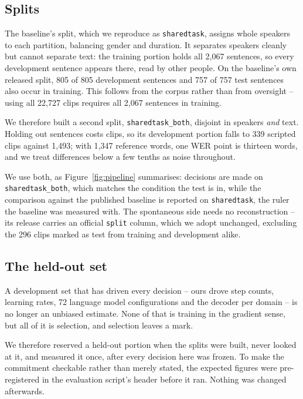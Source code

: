 \subsection{Splits}
\label{sec:splits}

The baseline's split, which we reproduce as \texttt{sharedtask}, assigns whole
speakers to each partition, balancing gender and duration. It separates
speakers cleanly but cannot separate text: the training portion holds all
2{,}067 sentences, so every development sentence appears there, read by other
people. On the baseline's own released split, 805 of 805 development sentences
and 757 of 757 test sentences also occur in training. This follows from the
corpus rather than from oversight -- using all 22{,}727 clips requires all
2{,}067 sentences in training.

We therefore built a second split, \texttt{sharedtask\_both}, disjoint in
speakers \emph{and} text. Holding out sentences costs clips, so its development
portion falls to 339 scripted clips against 1{,}493; with 1{,}347 reference
words, one WER point is thirteen words, and we treat differences below a few
tenths as noise throughout.

We use both, as Figure~\ref{fig:pipeline} summarises: decisions are made on
\texttt{sharedtask\_both}, which matches the condition the test is in, while
the comparison against the published baseline is reported on
\texttt{sharedtask}, the ruler the baseline was measured with.
The spontaneous side needs no reconstruction -- its release carries an official
\texttt{split} column, which we adopt unchanged, excluding the 296 clips marked
as test from training and development alike.

\subsection{The held-out set}
\label{sec:heldout}

A development set that has driven every decision -- ours drove step counts,
learning rates, 72 language model configurations and the decoder per domain --
is no longer an unbiased estimate. None of that is training in the gradient
sense, but all of it is selection, and selection leaves a mark.

We therefore reserved a held-out portion when the splits were built, never
looked at it, and measured it once, after every decision here was frozen. To
make the commitment checkable rather than merely stated, the expected figures
were pre-registered in the evaluation script's header before it ran. Nothing
was changed afterwards.
